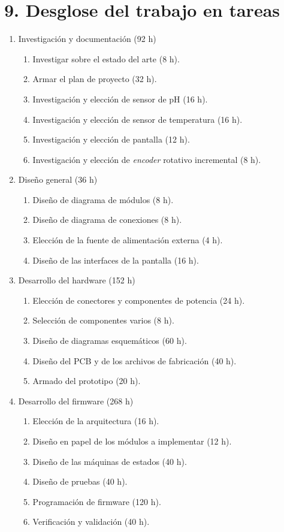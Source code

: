 \documentclass[
11pt, %
codirector, %
]{charter}
\begin{document}
\section{9. Desglose del trabajo en tareas}
\label{sec:wbs}

\begin{enumerate}
\item Investigación y documentación (92 h)
	\begin{enumerate}
	\item Investigar sobre el estado del arte (8 h).
	\item Armar el plan de proyecto (32 h).
	\item Investigación y elección de sensor de pH (16 h).
	\item Investigación y elección de sensor de temperatura (16 h).
	\item Investigación y elección de pantalla (12 h).
	\item Investigación y elección de \textit{encoder} rotativo incremental (8 h).
	\end{enumerate}
	
\item Diseño general (36 h)
	\begin{enumerate}
	\item Diseño de diagrama de módulos (8 h).
	\item Diseño de diagrama de conexiones (8 h).
	\item Elección de la fuente de alimentación externa (4 h).
	\item Diseño de las interfaces de la pantalla (16 h).
	\end{enumerate}
	
\item Desarrollo del hardware (152 h)
	\begin{enumerate}
	\item Elección de conectores y componentes de potencia (24 h).
	\item Selección de componentes varios (8 h).
	\item Diseño de diagramas esquemáticos (60 h).
	\item Diseño del PCB y de los archivos de fabricación (40 h).
	\item Armado del prototipo (20 h).
	\end{enumerate}
	
\item Desarrollo del firmware (268 h)
	\begin{enumerate}
	\item Elección de la arquitectura (16 h).
	\item Diseño en papel de los módulos a implementar (12 h).
	\item Diseño de las máquinas de estados (40 h).
	\item Diseño de pruebas (40 h).
	\item Programación de firmware (120 h).
	\item Verificación y validación (40 h).
	\end{enumerate}
	

\end{enumerate}
\end{document}
